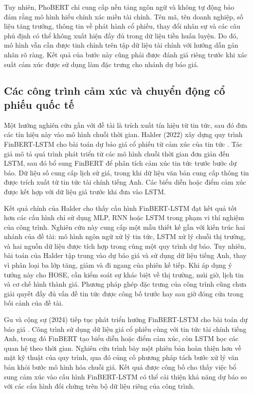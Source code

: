 \documentclass[12pt, a4paper, oneside]{report}
\begin{document}
Tuy nhiên, PhoBERT chỉ cung cấp nền tảng ngôn ngữ và không tự động bảo đảm rằng mô
hình hiểu chính xác miền tài chính. Tên mã, tên doanh nghiệp, số liệu tăng trưởng,
thông tin về phát hành cổ phiếu, thay đổi nhân sự và các câu phủ định có thể không xuất
hiện đầy đủ trong dữ liệu tiền huấn luyện. Do đó, mô hình vẫn cần được tinh chỉnh trên
tập dữ liệu tài chính với hướng dẫn gán nhãn rõ ràng. Kết quả của bước này cũng phải
được đánh giá riêng trước khi xác suất cảm xúc được sử dụng làm đặc trưng cho nhánh dự
báo giá.

\subsection{Các công trình cảm xúc và chuyển động cổ phiếu quốc tế}

Một hướng nghiên cứu gần với đề tài là trích xuất tín hiệu từ tin tức, sau đó đưa các
tín hiệu này vào mô hình chuỗi thời gian. Halder (2022) xây dựng quy trình
FinBERT-LSTM cho bài toán dự báo giá cổ phiếu từ cảm xúc của tin tức
\cite{Halder2022_221107392v1}. Tác giả mô tả quá trình phát triển từ các mô hình chuỗi
thời gian đơn giản đến LSTM, sau đó bổ sung FinBERT để phân tích cảm xúc tin tức trước
bước dự báo. Dữ liệu số cung cấp lịch sử giá, trong khi dữ liệu văn bản cung cấp thông
tin được trích xuất từ tin tức tài chính tiếng Anh. Các biểu diễn hoặc điểm cảm xúc
được kết hợp với dữ liệu giá trước khi đưa vào LSTM.

Kết quả chính của Halder cho thấy cấu hình FinBERT-LSTM đạt kết quả tốt hơn các cấu
hình chỉ sử dụng MLP, RNN hoặc LSTM trong phạm vi thí nghiệm của công trình. Nghiên cứu
này cung cấp một mẫu thiết kế gần với kiến trúc hai nhánh của đề tài: mô hình ngôn ngữ
xử lý tin tức, LSTM xử lý chuỗi thị trường, và hai nguồn dữ liệu được tích hợp trong
cùng một quy trình dự báo. Tuy nhiên, bài toán của Halder tập trung vào dự báo giá và
sử dụng dữ liệu tiếng Anh, thay vì phân loại ba lớp tăng, giảm và đi ngang của phiên kế
tiếp. Khi áp dụng ý tưởng này cho HOSE, cần kiểm soát sự khác biệt về thị trường, múi
giờ, lịch tin và cơ chế hình thành giá. Phương pháp ghép đặc trưng của công trình cũng
chưa giải quyết đầy đủ vấn đề tin tức được công bố trước hay sau giờ đóng cửa trong
bối cảnh của đề tài.

Gu và cộng sự (2024) tiếp tục phát triển hướng FinBERT-LSTM cho bài toán dự báo giá
\cite{Gu2024_240716150v1}. Công trình sử dụng dữ liệu giá cổ phiếu cùng với tin tức tài
chính tiếng Anh, trong đó FinBERT tạo biểu diễn hoặc điểm cảm xúc, còn LSTM học các
quan hệ theo thời gian. Nghiên cứu trình bày một phiên bản hoàn thiện hơn về mặt kỹ
thuật của quy trình, qua đó củng cố phương pháp tách bước xử lý văn bản khỏi bước mô
hình hóa chuỗi giá. Kết quả được công bố cho thấy việc bổ sung cảm xúc vào cấu hình
FinBERT-LSTM có thể cải thiện khả năng dự báo so với các cấu hình đối chứng trên bộ dữ
liệu riêng của công trình.
\end{document}
